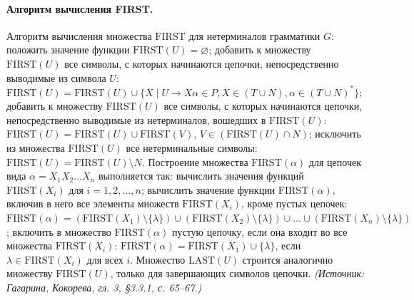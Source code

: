 \documentclass[a4paper,12pt]{article}
\begin{document}
\paragraph{Алгоритм вычисления FIRST.}
Алгоритм вычисления множества \(\mathrm{FIRST}\) для нетерминалов грамматики \(G\): положить значение функции \(\mathrm{FIRST}(U)=\varnothing\); добавить к множеству \(\mathrm{FIRST}(U)\) все символы, с которых начинаются цепочки, непосредственно выводимые из символа \(U\): \(\mathrm{FIRST}(U)=\mathrm{FIRST}(U)\cup\{X\mid U\to X\alpha\in P, X\in(T\cup N), \alpha\in(T\cup N)^*\}\); добавить к множеству \(\mathrm{FIRST}(U)\) все символы, с которых начинаются цепочки, непосредственно выводимые из нетерминалов, вошедших в \(\mathrm{FIRST}(U)\): \(\mathrm{FIRST}(U)=\mathrm{FIRST}(U)\cup\mathrm{FIRST}(V)\), \(V\in(\mathrm{FIRST}(U)\cap N)\); исключить из множества \(\mathrm{FIRST}(U)\) все нетерминальные символы: \(\mathrm{FIRST}(U)=\mathrm{FIRST}(U)\setminus N\). Построение множества \(\mathrm{FIRST}(\alpha)\) для цепочек вида \(\alpha=X_1X_2\ldots X_n\) выполняется так: вычислить значения функций \(\mathrm{FIRST}(X_i)\) для \(i=1,2,\ldots,n\); вычислить значение функции \(\mathrm{FIRST}(\alpha)\), включив в него все элементы множеств \(\mathrm{FIRST}(X_i)\), кроме пустых цепочек: \(\mathrm{FIRST}(\alpha)=(\mathrm{FIRST}(X_1)\setminus\{\lambda\})\cup(\mathrm{FIRST}(X_2)\setminus\{\lambda\})\cup\ldots\cup(\mathrm{FIRST}(X_n)\setminus\{\lambda\})\); включить в множество \(\mathrm{FIRST}(\alpha)\) пустую цепочку, если она входит во все множества \(\mathrm{FIRST}(X_i)\): \(\mathrm{FIRST}(\alpha)=\mathrm{FIRST}(X_1)\cup\{\lambda\}\), если \(\lambda\in\mathrm{FIRST}(X_i)\) для всех \(i\). Множество \(\mathrm{LAST}(U)\) строится аналогично множеству \(\mathrm{FIRST}(U)\), только для завершающих символов цепочки.
\textit{(Источник: Гагарина, Кокорева, гл. 3, §3.3.1, с. 65--67.)}
\end{document}
